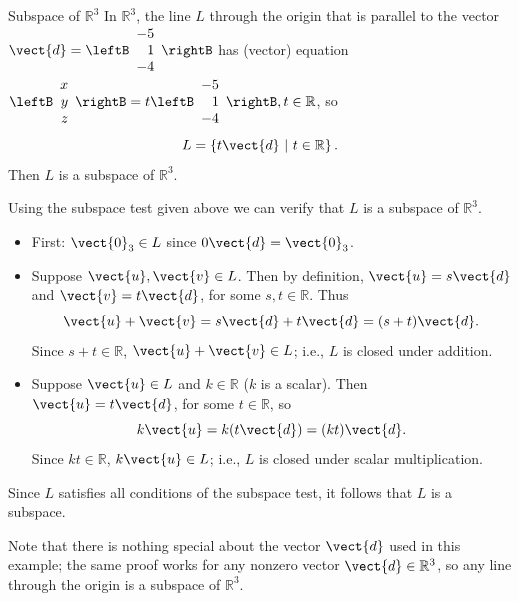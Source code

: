 \begin{example}{Subspace of $\mathbb{R}^3$}\label{exa:linesubspace}
In $\mathbb{R}^3$, the line $L$ through the origin that is
parallel to the vector
${\vect{d}}= \leftB \begin{array}{r} -5 \\ 1 \\ -4 \end{array}\rightB$ 
has (vector) equation
$\leftB \begin{array}{r} x \\ y \\ z \end{array}\rightB
=t\leftB \begin{array}{r} -5 \\ 1 \\ -4 \end{array}\rightB, t\in\mathbb{R}$,
so 
\[ L=\left\{ t{\vect{d}} ~|~ t\in\mathbb{R}\right\}.\] Then $L$ is a subspace of $\mathbb{R}^3$.  
\end{example}

\begin{solution}
Using the subspace test given above we can verify that $L$ is a subspace of $\mathbb{R}^3$. 
\begin{itemize}
\item First: $\vect{0}_3\in L$ since $0\vect{d}=\vect{0}_3$.
\item Suppose $\vect{u},\vect{v}\in L$.
Then by definition, $\vect{u}=s\vect{d}$ and $\vect{v}=t\vect{d}$, 
for some $s,t\in\mathbb{R}$.
Thus
\[ \vect{u}+\vect{v} = s\vect{d}+t\vect{d} = (s+t)\vect{d}.\]
Since $s+t\in\mathbb{R}$, $\vect{u}+\vect{v}\in L$;
i.e., $L$ is closed under addition.
\item Suppose $\vect{u}\in L$ and $k\in\mathbb{R}$ ($k$ is a scalar).
Then $\vect{u}=t\vect{d}$, for some $t\in\mathbb{R}$, so
\[ k\vect{u}=k(t\vect{d})=(kt)\vect{d}.\]
Since $kt\in\mathbb{R}$, $k\vect{u}\in L$;
i.e., $L$ is closed under scalar multiplication.
\end{itemize}
Since $L$ satisfies all conditions of the subspace test, it follows that $L$ is a subspace. 
\end{solution}

Note that there is nothing special about the vector $\vect{d}$ used
in this example; the same proof works for any nonzero
vector $\vect{d}\in\mathbb{R}^3$, so any line through the origin is
a subspace of $\mathbb{R}^3$.

